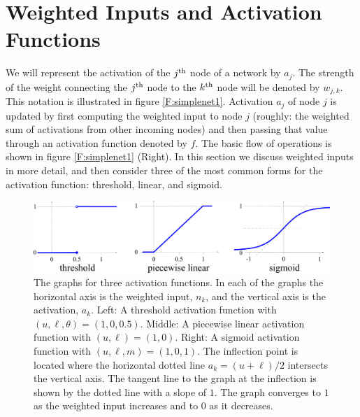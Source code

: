 \section{Weighted Inputs and Activation Functions}

 We will represent the activation of the $j^{\rm th}$ node of a network by $a_j$. The 
strength of the weight connecting the $j^{\rm th}$ node to the $k^{\rm th}$  node will be denoted by $w_{j,k}$. This notation is illustrated in figure \ref{F:simplenet1}. Activation $a_j$ of node $j$ is updated by first 
computing the weighted input to node $j$  (roughly: the weighted sum of activations from other incoming nodes) and then passing that value through an activation function denoted by $f$. The basic flow of operations is shown in figure \ref{F:simplenet1} (Right). In this section we discuss weighted inputs in more detail, and then consider three of the most common forms for the activation function: threshold, 
linear, and sigmoid.

\begin{figure}[h]
\centering
\includegraphics[scale=0.130]{./images/graph_binary4.pdf}
\caption[Scott Hotton.]{The graphs for three activation functions. In each of the graphs the 
horizontal axis is the weighted input, $n_k$, and the vertical axis is the 
activation, $a_k$. Left: A threshold activation function with $(u,\ell,\theta)
=(1,0,0.5)$. Middle: A piecewise linear activation function with 
$(u,\ell)=(1,0)$. Right: A sigmoid activation function with $(u,\ell,m) = 
(1,0,1)$. The inflection point is located where the horizontal dotted line 
$a_k = (u+\ell)/2$ intersects the vertical axis. The tangent line to the graph 
at the inflection is shown by the dotted line with a slope of $1$. The graph 
converges to $1$ as the weighted input increases and to $0$ as it decreases.}
\label{activationFunctions}
\end{figure}


